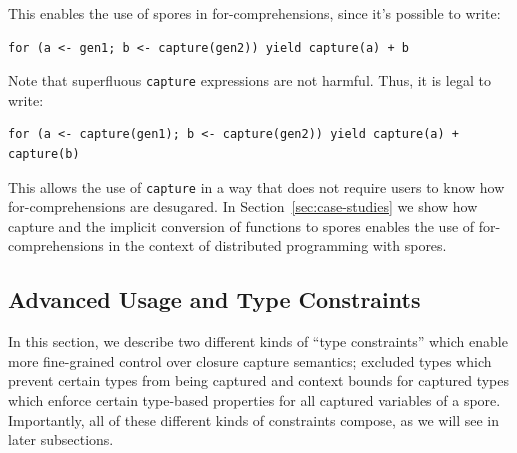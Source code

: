 \documentclass{llncs}
\begin{document}
This enables the use of spores in for-comprehensions, since it's possible to write:

\begin{lstlisting}[numbers=none]
    for (a <- gen1; b <- capture(gen2)) yield capture(a) + b
\end{lstlisting}

\noindent Note that superfluous \verb|capture| expressions are not harmful. Thus, it is
legal to write:

\begin{lstlisting}[numbers=none]
    for (a <- capture(gen1); b <- capture(gen2)) yield capture(a) + capture(b)
\end{lstlisting}

\noindent This allows the use of \verb|capture| in a way that does not require users to
know how for-comprehensions are desugared. In Section~\ref{sec:case-studies}
we show how capture and the implicit conversion of functions to spores enables
the use of for-comprehensions in the context of distributed programming with
spores.







\vspace{2mm}
\subsection{Advanced Usage and Type Constraints}
\label{sec:adv-usage-type-constraints}
\vspace{1mm}

In this section, we describe two different kinds of ``type constraints'' which
enable more fine-grained control over closure capture semantics; excluded
types which prevent certain types from being captured and context bounds for
captured types which enforce certain type-based properties for all captured
variables of a spore. Importantly, all of these different kinds of constraints
compose, as we will see in later subsections.
\end{document}

